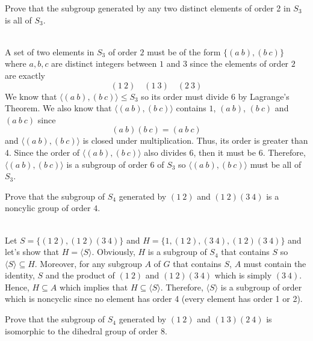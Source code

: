 \begin{exercise}
    Prove that the subgroup generated by any two distinct elements of order 2 in $S_3$ is all of $S_3$.\\
\end{exercise}

\begin{solution}
    \\ A set of two elements in $S_3$ of order $2$ must be of the form $\{(a \ b), (b \ c)\}$ where $a,b,c$ are distinct integers between $1$ and $3$ since the elements of order $2$ are exactly
    $$(1 \ 2) \quad (1 \ 3) \quad (2 \ 3)$$
    We know that $\langle (a \ b), (b \ c) \rangle \leq S_3$ so its order must divide 6 by Lagrange's Theorem. We also know that $\langle (a \ b), (b \ c) \rangle$ contains $1$, $(a \ b)$, $(b \ c)$ and $(a \ b \ c)$ since 
    $$(a \ b)(b \ c) = (a \ b \ c)$$
    and $\langle (a \ b), (b \ c) \rangle$ is closed under multiplication. Thus, its order is greater than 4. Since the order of $\langle (a \ b), (b \ c) \rangle$ also divides 6, then it must be 6. Therefore, $\langle (a \ b), (b \ c) \rangle$ is a subgroup of order 6 of $S_3$ so $\langle (a \ b), (b \ c) \rangle$ must be all of $S_3$. \\
\end{solution}

\begin{exercise}
    Prove that the subgroup of $S_4$ generated by $(1 \ 2)$ and $(1 \ 2)(3 \ 4)$ is a noncylic group of order $4$.\\
\end{exercise}

\begin{solution}
    \\ Let $S =  \{(1 \ 2), (1 \ 2)(3 \ 4)\}$ and $H = \{1, (1 \ 2), (3 \ 4), (1 \ 2)(3 \ 4)\}$ and let's show that $H = \langle S \rangle$. Obviously, $H$ is a subgroup of $S_4$ that contains $S$ so $\langle S \rangle \subseteq H$. Moreover, for any subgroup $A$ of $G$ that contains $S$, $A$ must contain the identity, $S$ and the product of $(1 \ 2)$ and $(1 \ 2)(3 \ 4)$ which is simply $(3 \ 4)$. Hence, $H\subseteq A$ which implies that $H \subseteq \langle S \rangle$. Therefore, $\langle S \rangle$ is a subgroup of order which is noncyclic since no element has order 4 (every element has order 1 or 2).\\
\end{solution}

\begin{exercise}
    Prove that the subgroup of $S_4$ generated by $(1 \ 2)$ and $(1 \ 3)(2 \ 4)$ is isomorphic to the dihedral group of order 8.\\
\end{exercise}


